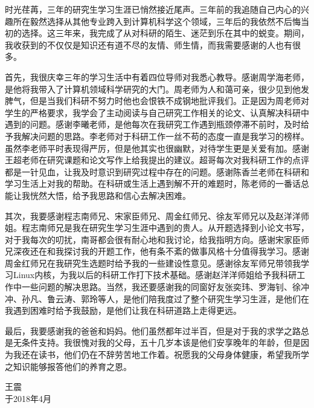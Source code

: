 \begin{acknowledgements}
时光荏苒，三年的研究生学习生涯已悄然接近尾声。三年前的我追随自己内心的兴趣所在毅然选择从其他专业跨入到计算机科学这个领域，三年后的我依然不后悔当初的选择。这三年来，我完成了从对科研的陌生、迷茫到乐在其中的蜕变。期间，我收获到的不仅仅是知识还有道不尽的友情、师生情，而我需要感谢的人也有很多。

首先，我很庆幸三年的学习生活中有着四位导师对我悉心教导。感谢周学海老师，是他将我带入了计算机领域科学研究的大门。周老师为人和蔼可亲，很少见到他发脾气，但是当我们科研不努力时他也会恨铁不成钢地批评我们。正是因为周老师对学生的严格要求，我学会了主动阅读与自己研究工作相关的论文、认真解决科研中遇到的问题。感谢李曦老师，是他每次在我研究工作遇到瓶颈停滞不前时，及时给予我解决问题的思路。李老师对于科研工作一丝不苟的态度一直是我学习的榜样。虽然李老师平时表现得严厉，但是他其实也很幽默，对待学生更是关爱有加。感谢王超老师在研究课题和论文写作上给我提出的建议。超哥每次对我科研工作的点评都是一针见血，让我及时意识到研究过程中存在的问题。感谢陈香兰老师在科研和学习生活上对我的帮助。在科研或生活上遇到解不开的难题时，陈老师的一番话总能让我恍然大悟，给予我思路和信心去解决困难。

其次，我要感谢程志南师兄、宋家臣师兄、周金红师兄、徐友军师兄以及赵洋洋师姐。程志南师兄是我在研究生学习生涯中遇到的贵人。从开题选择到小论文书写，对于我每次的叨扰，南哥都会很有耐心地和我讨论，给我指明方向。感谢宋家臣师兄深夜还在和我探讨我的开题工作，他有条不紊的做事风格十分值得我学习。感谢周金红师兄在我研究生选题时给予我的一些建设性意见。感谢徐友军师兄带领我学习Linux内核，为我以后的科研工作打下技术基础。感谢赵洋洋师姐给予我科研工作中一些问题的解决思路。当然，我还要感谢我的同窗好友张奕玮、罗海钊、徐冲冲、孙凡、鲁云涛、郭玲等人，是他们陪我度过了整个研究生学习生涯，是他们在我遇到困难时给予我鼓励，是他们让我在科研道路上走得更远。

最后，我要感谢我的爸爸和妈妈。他们虽然都年过半百，但是对于我的求学之路总是无条件支持。我很愧对我的父母，五十几岁本该是他们安享晚年的年龄，但是因为我还在读书，他们仍在不辞劳苦地工作着。祝愿我的父母身体健康，希望我所学之知识能够报答他们的养育之恩。

\begin{flushright}
王震 \\
于2018年4月
\end{flushright}



\end{acknowledgements}
